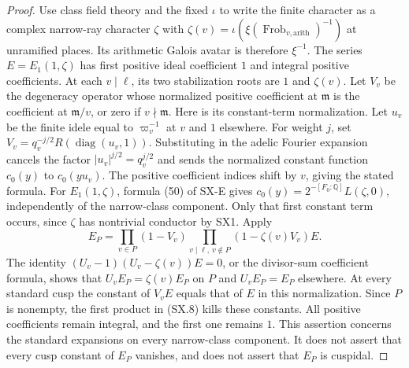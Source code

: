 \begin{proof}
Use class field theory and the fixed $\iota$ to write the finite
character as a complex narrow-ray character $\zeta$ with
$\zeta(v)=\iota(\xi(\operatorname{Frob}_{v,\mathrm{arith}})^{-1})$
at unramified places.  Its arithmetic Galois avatar is therefore
$\xi^{-1}$.  The series $E=E_1(1,\zeta)$
has first positive ideal coefficient $1$ and integral positive
coefficients.  At each $v\mid\ell$, its two stabilization roots
are $1$ and $\zeta(v)$.  Let $V_v$ be the degeneracy operator
whose normalized positive coefficient at $\mathfrak m$ is the
coefficient at $\mathfrak m/v$, or zero if $v\nmid\mathfrak m$.
Here is its constant-term normalization.  Let $u_v$ be the finite
idele equal to $\varpi_v^{-1}$ at $v$ and $1$ elsewhere.
For weight $j$, set
$V_v=q_v^{-j/2}R(\operatorname{diag}(u_v,1))$.
Substituting in the adelic Fourier expansion cancels the factor
$|u_v|^{j/2}=q_v^{j/2}$ and sends the normalized constant
function $c_0(y)$ to $c_0(yu_v)$.  The positive coefficient
indices shift by $v$, giving the stated formula.
For $E_1(1,\zeta)$, formula (50) of SX-E gives
$c_0(y)=2^{-[F_0:\mathbb Q]}L(\zeta,0)$, independently of
the narrow-class component.  Only that first constant term
occurs, since $\zeta$ has nontrivial conductor by SX1.
Apply
\[
 E_P=\prod_{v\in P}(1-V_v)
       \prod_{v\mid\ell,\,v\notin P}(1-\zeta(v)V_v)E.
                                                            \tag{SX.8}
\]
The identity $(U_v-1)(U_v-\zeta(v))E=0$, or the divisor-sum
coefficient formula, shows that $U_v E_P=\zeta(v)E_P$ on $P$
and $U_v E_P=E_P$ elsewhere.  At every standard cusp the constant
of $V_vE$ equals that of $E$ in this normalization.  Since $P$
is nonempty, the first product in (SX.8) kills these constants.
All positive coefficients remain integral, and the first one remains
$1$.  This assertion concerns the standard expansions on every
narrow-class component.  It does not assert that every cusp constant
of $E_P$ vanishes, and does not assert that $E_P$ is cuspidal.


\end{proof}
